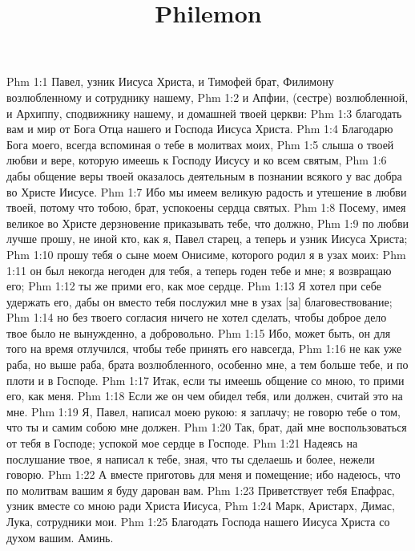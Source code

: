 

\title{Philemon}

Phm 1:1  Павел, узник Иисуса Христа, и Тимофей брат, Филимону возлюбленному и сотруднику нашему,
Phm 1:2  и Апфии, (сестре) возлюбленной, и Архиппу, сподвижнику нашему, и домашней твоей церкви:
Phm 1:3  благодать вам и мир от Бога Отца нашего и Господа Иисуса Христа.
Phm 1:4  Благодарю Бога моего, всегда вспоминая о тебе в молитвах моих,
Phm 1:5  слыша о твоей любви и вере, которую имеешь к Господу Иисусу и ко всем святым,
Phm 1:6  дабы общение веры твоей оказалось деятельным в познании всякого у вас добра во Христе Иисусе.
Phm 1:7  Ибо мы имеем великую радость и утешение в любви твоей, потому что тобою, брат, успокоены сердца святых.
Phm 1:8  Посему, имея великое во Христе дерзновение приказывать тебе, что должно,
Phm 1:9  по любви лучше прошу, не иной кто, как я, Павел старец, а теперь и узник Иисуса Христа;
Phm 1:10  прошу тебя о сыне моем Онисиме, которого родил я в узах моих:
Phm 1:11  он был некогда негоден для тебя, а теперь годен тебе и мне; я возвращаю его;
Phm 1:12  ты же прими его, как мое сердце.
Phm 1:13  Я хотел при себе удержать его, дабы он вместо тебя послужил мне в узах [за] благовествование;
Phm 1:14  но без твоего согласия ничего не хотел сделать, чтобы доброе дело твое было не вынужденно, а добровольно.
Phm 1:15  Ибо, может быть, он для того на время отлучился, чтобы тебе принять его навсегда,
Phm 1:16  не как уже раба, но выше раба, брата возлюбленного, особенно мне, а тем больше тебе, и по плоти и в Господе.
Phm 1:17  Итак, если ты имеешь общение со мною, то прими его, как меня.
Phm 1:18  Если же он чем обидел тебя, или должен, считай это на мне.
Phm 1:19  Я, Павел, написал моею рукою: я заплачу; не говорю тебе о том, что ты и самим собою мне должен.
Phm 1:20  Так, брат, дай мне воспользоваться от тебя в Господе; успокой мое сердце в Господе.
Phm 1:21  Надеясь на послушание твое, я написал к тебе, зная, что ты сделаешь и более, нежели говорю.
Phm 1:22  А вместе приготовь для меня и помещение; ибо надеюсь, что по молитвам вашим я буду дарован вам.
Phm 1:23  Приветствует тебя Епафрас, узник вместе со мною ради Христа Иисуса,
Phm 1:24  Марк, Аристарх, Димас, Лука, сотрудники мои.
Phm 1:25  Благодать Господа нашего Иисуса Христа со духом вашим. Аминь.


